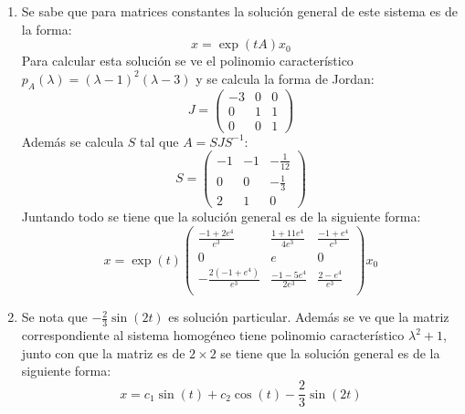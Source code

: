 \documentclass{homework}
\begin{document}
\begin{sol}
    \begin{enumerate}[label=(\alph*)]
        \item Se sabe que para matrices constantes la solución general de este sistema es de la forma:
        \begin{equation*}
            x=\exp(tA)x_0
        \end{equation*}
        Para calcular esta solución se ve el polinomio característico \(p_A(\lambda)=(\lambda-1)^2(\lambda-3)\) y se calcula la forma de Jordan:
        \begin{equation*}
            J=\begin{pmatrix}
                -3&0&0\\
                0&1&1\\
                0&0&1
            \end{pmatrix}
        \end{equation*}
        Además se calcula \(S\) tal que \(A=SJS^{-1}\):
        \begin{equation*}
            S=\begin{pmatrix}
                -1&-1&-\frac1{12}\\
                0&0&-\frac13\\
                2&1&0
            \end{pmatrix}
        \end{equation*}
        Juntando todo se tiene que la solución general es de la siguiente forma:
        \begin{equation*}
            x=\exp(t)\begin{pmatrix}
                \frac{-1+2 e^4}{e^3} & \frac{1+11 e^4}{4 e^3} & \frac{-1+e^4}{e^3} \\
 0 & e & 0 \\
 -\frac{2 \left(-1+e^4\right)}{e^3} & \frac{-1-5 e^4}{2 e^3} & \frac{2-e^4}{e^3} \\
            \end{pmatrix}x_0
        \end{equation*}
        \item Se nota que \(-\frac23\sin(2t)\) es solución particular. Además se ve que la matriz correspondiente al sistema homogéneo tiene polinomio característico \(\lambda^2+1\), junto con que la matriz es de \(2\times2\) se tiene que la solución general es de la siguiente forma:
        \begin{equation*}
            x=c_1\sin(t)+c_2\cos(t)-\frac23\sin(2t)
        \end{equation*}

\end{enumerate}
\end{sol}
\end{document}
